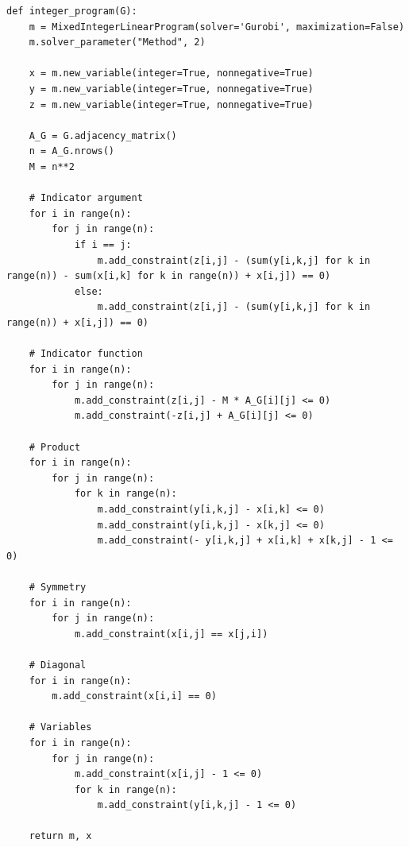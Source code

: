 
\begin{lstlisting}[style=python, caption={Integer Program.}, label={lst::integer_program}]
def integer_program(G):
    m = MixedIntegerLinearProgram(solver='Gurobi', maximization=False)
    m.solver_parameter("Method", 2)

    x = m.new_variable(integer=True, nonnegative=True)
    y = m.new_variable(integer=True, nonnegative=True)
    z = m.new_variable(integer=True, nonnegative=True)

    A_G = G.adjacency_matrix()
    n = A_G.nrows()
    M = n**2

    # Indicator argument
    for i in range(n):
        for j in range(n):
            if i == j:
                m.add_constraint(z[i,j] - (sum(y[i,k,j] for k in range(n)) - sum(x[i,k] for k in range(n)) + x[i,j]) == 0)
            else:
                m.add_constraint(z[i,j] - (sum(y[i,k,j] for k in range(n)) + x[i,j]) == 0)

    # Indicator function
    for i in range(n):
        for j in range(n):
            m.add_constraint(z[i,j] - M * A_G[i][j] <= 0)
            m.add_constraint(-z[i,j] + A_G[i][j] <= 0)

    # Product
    for i in range(n):
        for j in range(n):
            for k in range(n):
                m.add_constraint(y[i,k,j] - x[i,k] <= 0)
                m.add_constraint(y[i,k,j] - x[k,j] <= 0)
                m.add_constraint(- y[i,k,j] + x[i,k] + x[k,j] - 1 <= 0)

    # Symmetry
    for i in range(n):
        for j in range(n):
            m.add_constraint(x[i,j] == x[j,i])

    # Diagonal
    for i in range(n):
        m.add_constraint(x[i,i] == 0)

    # Variables
    for i in range(n):
        for j in range(n):
            m.add_constraint(x[i,j] - 1 <= 0)
            for k in range(n):
                m.add_constraint(y[i,k,j] - 1 <= 0)

    return m, x
\end{lstlisting}

